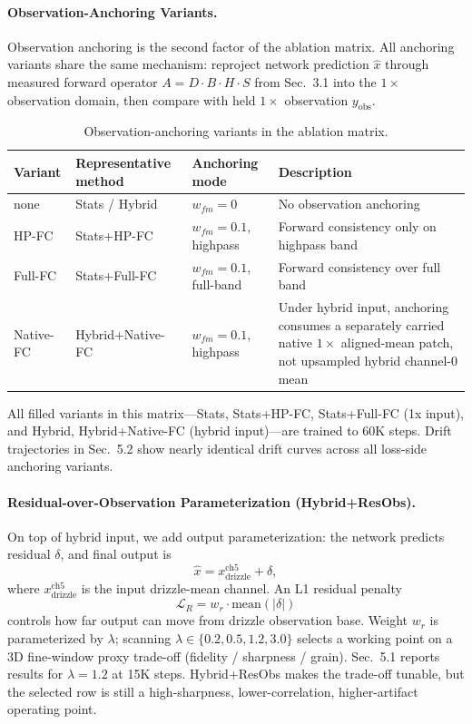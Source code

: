 \paragraph{Observation-Anchoring Variants.}
Observation anchoring is the second factor of the ablation matrix. All anchoring variants share the same mechanism: reproject network prediction $\hat{x}$ through measured forward operator $A=D\cdot B\cdot H\cdot S$ from Sec.~3.1 into the $1\times$ observation domain, then compare with held $1\times$ observation $y_{\mathrm{obs}}$.

\begin{table}[t]
  \centering
  \small
  \begin{tabular}{@{}llll@{}}
    \toprule
    Variant & Representative method & Anchoring mode & Description \\
    \midrule
    none & Stats / Hybrid & $w_{fm}=0$ & No observation anchoring \\
    HP-FC & Stats+HP-FC & $w_{fm}=0.1$, highpass & Forward consistency only on highpass band \\
    Full-FC & Stats+Full-FC & $w_{fm}=0.1$, full-band & Forward consistency over full band \\
    Native-FC & Hybrid+Native-FC & $w_{fm}=0.1$, highpass & Under hybrid input, anchoring consumes a separately carried native $1\times$ aligned-mean patch, not upsampled hybrid channel-0 mean \\
    \bottomrule
  \end{tabular}
  \caption{Observation-anchoring variants in the ablation matrix.}
\end{table}

All filled variants in this matrix---Stats, Stats+HP-FC, Stats+Full-FC (1x input), and Hybrid, Hybrid+Native-FC (hybrid input)---are trained to 60K steps. Drift trajectories in Sec.~5.2 show nearly identical drift curves across all loss-side anchoring variants.

\paragraph{Residual-over-Observation Parameterization (Hybrid+ResObs).}
On top of hybrid input, we add output parameterization: the network predicts residual $\delta$, and final output is
\[
\hat{x}=x_{\mathrm{drizzle}}^{\mathrm{ch5}}+\delta,
\]
where $x_{\mathrm{drizzle}}^{\mathrm{ch5}}$ is the input drizzle-mean channel. An L1 residual penalty
\[
\mathcal{L}_R=w_r\cdot\mathrm{mean}(|\delta|)
\]
controls how far output can move from drizzle observation base. Weight $w_r$ is parameterized by $\lambda$; scanning $\lambda\in\{0.2,0.5,1.2,3.0\}$ selects a working point on a 3D fine-window proxy trade-off (fidelity / sharpness / grain). Sec.~5.1 reports results for $\lambda=1.2$ at 15K steps. Hybrid+ResObs makes the trade-off tunable, but the selected row is still a high-sharpness, lower-correlation, higher-artifact operating point.

